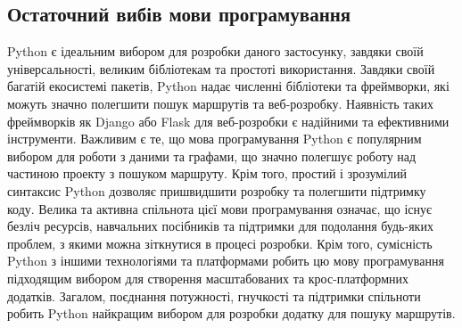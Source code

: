 \subsection{Остаточний вибів мови програмування}
\label{subsec:final-choice-subsection}

Python є ідеальним вибором для розробки даного застосунку, завдяки своїй універсальності, великим бібліотекам та простоті використання. Завдяки своїй багатій екосистемі пакетів, Python надає численні бібліотеки та фреймворки, які можуть значно полегшити пошук маршрутів та веб-розробку. Наявність таких фреймворків як Django або Flask для веб-розробки є надійними та ефективними інструменти. Важливим є те, що мова програмування Python є популярним вибором для роботи з даними та графами, що значно полегшує роботу над частиною проекту з пошуком маршруту. Крім того, простий і зрозумілий синтаксис Python дозволяє пришвидшити розробку та полегшити підтримку коду. Велика та активна спільнота цієї мови програмування означає, що існує безліч ресурсів, навчальних посібників та підтримки для подолання будь-яких проблем, з якими можна зіткнутися в процесі розробки. Крім того, сумісність Python з іншими технологіями та платформами робить цю мову програмування підходящим вибором для створення масштабованих та крос-платформних додатків. Загалом, поєднання потужності, гнучкості та підтримки спільноти робить Python найкращим вибором для розробки додатку для пошуку маршрутів.